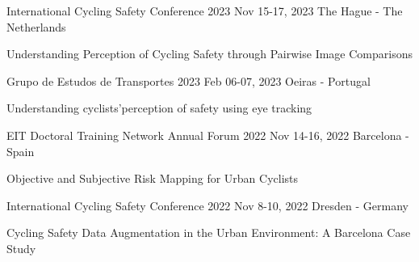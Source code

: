 

\begin{cventries}

\cventrypresentation
{International Cycling Safety Conference 2023} %
{Nov 15-17, 2023} %
{The Hague - The Netherlands} %
{
	\begin{cvpresentationitems} %
		\item {} {Understanding Perception of Cycling Safety through Pairwise Image Comparisons}
	\end{cvpresentationitems}
}

\cventrypresentation
{Grupo de Estudos de Transportes 2023} %
{Feb 06-07, 2023} %
{Oeiras - Portugal} %
{
	\begin{cvpresentationitems} %
		\item {} {Understanding cyclists'perception of safety using eye tracking}
	\end{cvpresentationitems}
}

\cventrypresentation
	{EIT Doctoral Training Network Annual Forum 2022} %
	{Nov 14-16, 2022} %
	{Barcelona - Spain} %
	{
		\begin{cvpresentationitems} %
			\item {} {Objective and Subjective Risk Mapping for Urban Cyclists}
		\end{cvpresentationitems}
	}

  \cventrypresentation
	{International Cycling Safety Conference 2022} %
	{Nov 8-10, 2022} %
	{Dresden - Germany} %
	{
		\begin{cvpresentationitems} %
			\item {} {Cycling Safety Data Augmentation 
			in the Urban Environment: A Barcelona Case Study}
		\end{cvpresentationitems}
	}


\end{cventries}

